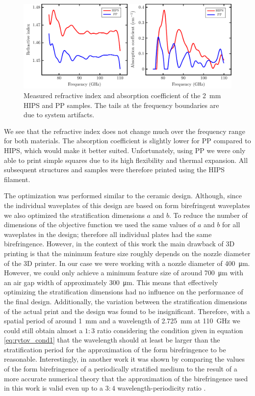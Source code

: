 \begin{figure}[H]
    \centering
    \includegraphics[scale=0.7]{images/results/plots/polymer/HIPS_PP_ri.pdf}
    \caption{Measured refractive index and absorption coefficient of the \SI{2}{\milli \meter} HIPS and PP samples. The tails at the frequency boundaries are due to system artifacts.}
    \label{fig:HIPS_PP_ri}
\end{figure}

 We see that the refractive index does not change much over the frequency range for both materials. The absorption coefficient is slightly lower for PP compared to HIPS, which would make it better suited. Unfortunately, using PP we were only able to print simple squares due to its high flexibility and thermal expansion. All subsequent structures and samples were therefore printed using the HIPS filament.

The optimization was performed similar to the ceramic design. Although, since the individual waveplates of this design are based on form birefringent waveplates we also optimized the stratification dimensions $a$ and $b$. To reduce the number of dimensions of the objective function we used the same values of $a$ and $b$ for all waveplates in the design; therefore all individual plates had the same birefringence. However, in the context of this work the main drawback of 3D printing is that the minimum feature size roughly depends on the nozzle diameter of the 3D printer. In our case we were working with a nozzle diameter of \SI{400}{\micro \meter}. However, we could only achieve a minimum feature size of around \SI{700}{\micro \meter} with an air gap width of approximately \SI{300}{\micro \meter}. This means that effectively optimizing the stratification dimensions had no influence on the performance of the final design. Additionally, the variation between the stratification dimensions of the actual print and the design was found to be insignificant. 
Therefore, with a spatial period of around \SI{1}{\milli \meter} and a wavelength of \SI{2.725}{\milli \meter} at \SI{110}{\giga \hertz} we could still obtain almost a $1:3$ ratio considering the condition given in equation \ref{eq:rytov_cond1} that the wavelength should at least be larger than the stratification period for the approximation of the form birefringence to be reasonable. Interestingly, in another work it was shown by comparing the values of the form birefringence of a periodically stratified medium to the result of a more accurate numerical theory that the approximation of the birefringence used in this work is valid even up to a $3:4$ wavelength-periodicity ratio \cite{Busch2016}.

